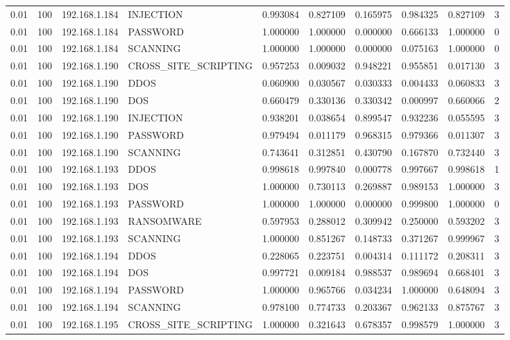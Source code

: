 \begin{tabular}{llllllllll}
0.01 & 100 & 192.168.1.184 & INJECTION & 0.993084 & 0.827109 & 0.165975 & 0.984325 & 0.827109 & 3 \\
0.01 & 100 & 192.168.1.184 & PASSWORD & 1.000000 & 1.000000 & 0.000000 & 0.666133 & 1.000000 & 0 \\
0.01 & 100 & 192.168.1.184 & SCANNING & 1.000000 & 1.000000 & 0.000000 & 0.075163 & 1.000000 & 0 \\
0.01 & 100 & 192.168.1.190 & CROSS\_SITE\_SCRIPTING & 0.957253 & 0.009032 & 0.948221 & 0.955851 & 0.017130 & 3 \\
0.01 & 100 & 192.168.1.190 & DDOS & 0.060900 & 0.030567 & 0.030333 & 0.004433 & 0.060833 & 3 \\
0.01 & 100 & 192.168.1.190 & DOS & 0.660479 & 0.330136 & 0.330342 & 0.000997 & 0.660066 & 2 \\
0.01 & 100 & 192.168.1.190 & INJECTION & 0.938201 & 0.038654 & 0.899547 & 0.932236 & 0.055595 & 3 \\
0.01 & 100 & 192.168.1.190 & PASSWORD & 0.979494 & 0.011179 & 0.968315 & 0.979366 & 0.011307 & 3 \\
0.01 & 100 & 192.168.1.190 & SCANNING & 0.743641 & 0.312851 & 0.430790 & 0.167870 & 0.732440 & 3 \\
0.01 & 100 & 192.168.1.193 & DDOS & 0.998618 & 0.997840 & 0.000778 & 0.997667 & 0.998618 & 1 \\
0.01 & 100 & 192.168.1.193 & DOS & 1.000000 & 0.730113 & 0.269887 & 0.989153 & 1.000000 & 3 \\
0.01 & 100 & 192.168.1.193 & PASSWORD & 1.000000 & 1.000000 & 0.000000 & 0.999800 & 1.000000 & 0 \\
0.01 & 100 & 192.168.1.193 & RANSOMWARE & 0.597953 & 0.288012 & 0.309942 & 0.250000 & 0.593202 & 3 \\
0.01 & 100 & 192.168.1.193 & SCANNING & 1.000000 & 0.851267 & 0.148733 & 0.371267 & 0.999967 & 3 \\
0.01 & 100 & 192.168.1.194 & DDOS & 0.228065 & 0.223751 & 0.004314 & 0.111172 & 0.208311 & 3 \\
0.01 & 100 & 192.168.1.194 & DOS & 0.997721 & 0.009184 & 0.988537 & 0.989694 & 0.668401 & 3 \\
0.01 & 100 & 192.168.1.194 & PASSWORD & 1.000000 & 0.965766 & 0.034234 & 1.000000 & 0.648094 & 3 \\
0.01 & 100 & 192.168.1.194 & SCANNING & 0.978100 & 0.774733 & 0.203367 & 0.962133 & 0.875767 & 3 \\
0.01 & 100 & 192.168.1.195 & CROSS\_SITE\_SCRIPTING & 1.000000 & 0.321643 & 0.678357 & 0.998579 & 1.000000 & 3 \\

\end{tabular}
